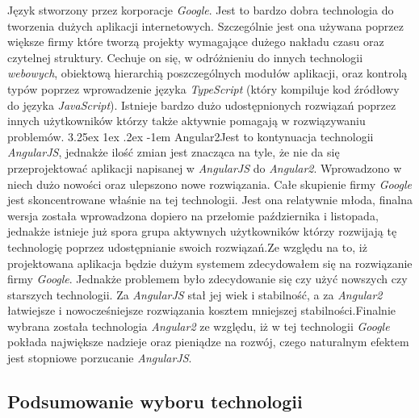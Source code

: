 \documentclass[10pt,titlepage]{article} %
\makeatletter
\renewcommand{\normalsize}{\fontsize{8pt}{10pt}\selectfont} %
\renewcommand\paragraph{\@startsection{paragraph}{5}{\z@}%
  {3.25ex \@plus1ex \@minus.2ex}%
  {-1em}%
  {\normalfont\normalsize\bfseries}}
\makeatother
\begin{document}
Język stworzony przez korporacje \textit{Google}. Jest to bardzo dobra technologia do tworzenia dużych aplikacji internetowych. Szczególnie jest ona używana poprzez większe firmy które tworzą projekty wymagające dużego nakładu czasu oraz czytelnej struktury. Cechuje on się, w odróżnieniu do innych technologii \textit{webowych}, obiektową hierarchią poszczególnych modułów aplikacji, oraz kontrolą typów poprzez wprowadzenie języka \textit{TypeScript} (który kompiluje kod źródłowy do języka \textit{JavaScript}). Istnieje bardzo dużo udostępnionych rozwiązań poprzez innych użytkowników którzy także aktywnie pomagają w rozwiązywaniu problemów.
\paragraph{Angular2}\mbox\\

Jest to kontynuacja technologii \textit{AngularJS}, jednakże ilość zmian jest znacząca na tyle, że nie da się przeprojektować aplikacji napisanej w \textit{AngularJS} do \textit{Angular2}. Wprowadzono w niech dużo nowości oraz ulepszono nowe rozwiązania. Całe skupienie firmy \textit{Google} jest skoncentrowane właśnie na tej technologii. Jest ona relatywnie młoda, finalna wersja została wprowadzona dopiero na przełomie października i listopada, jednakże istnieje już spora grupa aktywnych użytkowników którzy rozwijają tę technologię poprzez udostępnianie swoich rozwiązań.\mbox\\
Ze względu na to, iż projektowana aplikacja będzie dużym systemem zdecydowałem się na rozwiązanie firmy \textit{Google}. Jednakże problemem było zdecydowanie się czy użyć nowszych czy starszych technologii. Za \textit{AngularJS} stał jej wiek i stabilność, a za \textit{Angular2} łatwiejsze i nowocześniejsze rozwiązania kosztem mniejszej stabilności.\mbox\\
Finalnie wybrana została technologia \textit{Angular2} ze względu, iż w tej technologii \textit{Google} pokłada największe nadzieje oraz pieniądze na rozwój, czego naturalnym efektem jest stopniowe porzucanie \textit{AngularJS}.


\subsection{Podsumowanie wyboru technologii}
\end{document}
